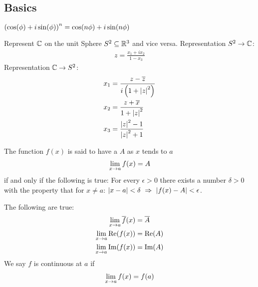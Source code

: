 \subsection{Basics}

\begin{theorem}
    $\left( \cos(\phi) + i \sin(\phi) \right)^n = \cos(n \phi) + i \sin(n \phi)$
\end{theorem}

\begin{theorem}
    Represent $\mathbb{C}$ on the unit Sphere $S^2 \subseteq \mathbb{R}^3$ and vice versa.
    Representation $S^2 \rightarrow \mathbb{C}$:
    \begin{align*}
        z = \frac{x_1 + i x_2}{1 - x_3}
    \end{align*}
    Representation $\mathbb{C} \rightarrow S^2$:
    \begin{align*}
        x_1 &= \frac{z - \overline{z}}{i \left( 1+\left\vert z \right\vert^2 \right)}
        \\
        x_2 &= \frac{z + \overline{x}}{1+\left\vert z \right\vert^2}
        \\
        x_3 &= \frac{\left\vert z \right\vert^2 - 1}{\left\vert z \right\vert^2 + 1}
    \end{align*}
\end{theorem}

\begin{definition}[Limit]
    The function $f(x)$ is said to have a  $A$ as $x$ tends to $a$
    \begin{align*}
        \lim\limits_{x \rightarrow a} f(x) = A
    \end{align*}
    if and only if the following is true:
    For every $\epsilon >0$ there exists a number $\delta >0$ with the property that
    for $x \neq a$: $\abs{x - a} < \delta \ \Rightarrow \ \abs{f(x) - A} < \epsilon$.
\end{definition}

\begin{theorem}
    The following are true:
    \begin{align*}
        \lim\limits_{x \rightarrow a} \overline{f}(x) &= \overline{A}
        \\
        \lim\limits_{x \rightarrow a} \text{Re}(f(x)) &= \text{Re} (A)
        \\
        \lim\limits_{x \rightarrow a} \text{Im}(f(x)) &= \text{Im} (A)
    \end{align*} 
    We say $f$ is continuous at $a$ if
    \begin{align*}
        \lim\limits_{x \rightarrow a} f(x) = f(a)
    \end{align*}
\end{theorem}

